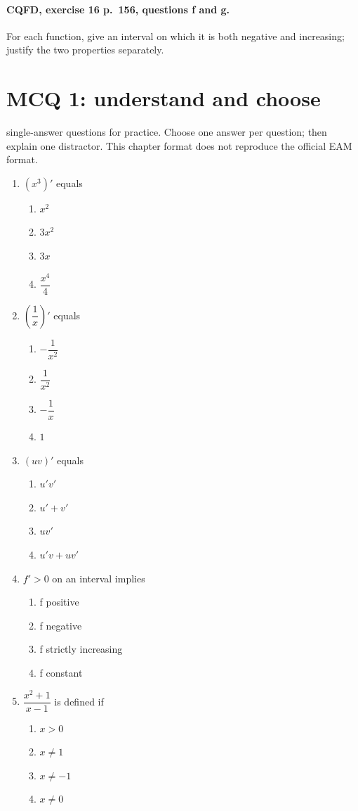 \paragraph{CQFD, exercise 16 p.~156, questions f and g.}\label{C06-M2} For each function, give an interval on which it is both negative and increasing; justify the two properties separately.
\begingroup\small
\mxnewpage\section*{MCQ 1: understand and choose}\label{C06-Q1}
 single-answer questions for practice. Choose one answer per question; then explain one distractor. This chapter format does not reproduce the official EAM format.
\begin{enumerate}
\item $(x^3)\prime$ equals
\begin{enumerate}[label=\Alph*.,itemsep=2pt]
\item $x^2$
\item $3x^2$
\item $3x$
\item $\dfrac{x^4}{4}$
\end{enumerate}
\item $(\dfrac{1}{x})\prime $ equals
\begin{enumerate}[label=\Alph*.,itemsep=2pt]
\item $-\dfrac{1}{x^2}$
\item $\dfrac{1}{x^2}$
\item $-\dfrac{1}{x}$
\item $1$
\end{enumerate}
\item $(uv)\prime$ equals
\begin{enumerate}[label=\Alph*.,itemsep=2pt]
\item $u\prime v\prime$
\item $u\prime+v\prime$
\item $uv\prime$
\item $u\prime v+uv\prime$
\end{enumerate}
\item $f\prime>0$ on an interval implies
\begin{enumerate}[label=\Alph*.,itemsep=2pt]
\item f positive
\item f negative
\item f strictly increasing
\item f constant
\end{enumerate}
\item $\dfrac{x^2+1}{x-1}$ is defined if
\begin{enumerate}[label=\Alph*.,itemsep=2pt]
\item $x>0$
\item $x\ne1$
\item $x\ne-1$
\item $x\ne0$
\end{enumerate}
\end{enumerate}
